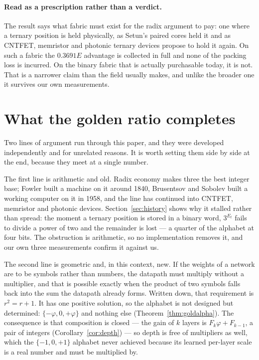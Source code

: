 \documentclass[11pt]{article}
\theoremstyle{definition}
\begin{document}
\paragraph{Read as a prescription rather than a verdict.} The result says what
fabric must exist for the radix argument to pay: one where a ternary position is
held physically, as Setun's paired cores held it and as CNTFET, memristor and
photonic ternary devices propose to hold it again. On such a fabric the
$0.3691E$ advantage is collected in full and none of the packing loss is
incurred. On the binary fabric that is actually purchasable today, it is not.
That is a narrower claim than the field usually makes, and unlike the broader one
it survives our own measurements.


\section{What the golden ratio completes}
\label{sec:completes}

Two lines of argument run through this paper, and they were developed
independently and for unrelated reasons. It is worth setting them side by side at
the end, because they meet at a single number.

The first line is arithmetic and old. Radix economy makes three the best integer
base; Fowler built a machine on it around 1840, Brusentsov and Sobolev built a
working computer on it in 1958, and the line has continued into CNTFET, memristor
and photonic devices. Section~\ref{sec:history} shows why it stalled rather than
spread: the moment a ternary position is stored in a binary word, $3^{E_t}$ fails
to divide a power of two and the remainder is lost --- a quarter of the alphabet
at four bits. The obstruction is arithmetic, so no implementation removes it, and
our own three measurements confirm it against us.

The second line is geometric and, in this context, new. If the weights of a
network are to be symbols rather than numbers, the datapath must multiply without
a multiplier, and that is possible exactly when the product of two symbols falls
back into the sum the datapath already forms. Written down, that requirement is
$r^2 = r + 1$. It has one positive solution, so the alphabet is not designed but
determined: $\{-\varphi, 0, +\varphi\}$ and nothing else
(Theorem~\ref{thm:goldalpha}). The consequence is that composition is closed ---
the gain of $k$ layers is $F_k\varphi + F_{k-1}$, a pair of integers
(Corollary~\ref{cor:depth}) --- so depth is free of multipliers as well, which the
$\{-1,0,+1\}$ alphabet never achieved because its learned per-layer scale is a
real number and must be multiplied by.
\end{document}
